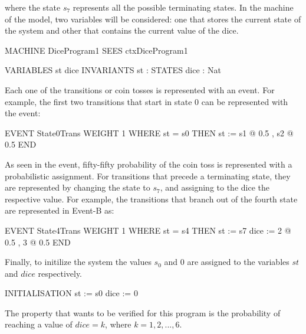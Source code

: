 where the state $s_7$ represents all the possible terminating states. In the machine of the model, two variables will be considered: one that stores the current state of the system and other that contains the current value of the dice.
\begin{maude}

MACHINE DiceProgram1
  SEES ctxDiceProgram1
  
  VARIABLES
    st 
    dice 
  INVARIANTS
    st : STATES
    dice : Nat 
\end{maude}
Each one of the transitions or coin tosses is represented with an event. For example, the first two transitions that start in state 0 can be represented with the event:
\begin{maude}

EVENT State0Trans 
WEIGHT 1
WHERE 
    st = s0
THEN
    st := {s1 @ 0.5 , s2 @ 0.5 }
END
\end{maude}
As seen in the event, fifty-fifty probability of the coin toss is represented with a probabilistic assignment. For transitions that precede a terminating state, they are represented by changing the state to $s_7$, and assigning to the dice the respective value. For example, the transitions that branch out of the fourth state are represented in Event-B as:
\begin{maude}

EVENT State4Trans 
WEIGHT 1
WHERE 
    st = s4
THEN
    st := s7
    dice := {2 @ 0.5 , 3 @ 0.5 }
END    
\end{maude}
Finally, to initilize the system the values $s_0$ and 0 are assigned to the variables $st$ and $dice$ respectively.
\begin{maude}

INITIALISATION
    st := s0
    dice := 0
\end{maude}


The property that wants to be verified for this program is the probability of reaching a value of $dice = k$, where $k = 1,2,...,6$. 

    